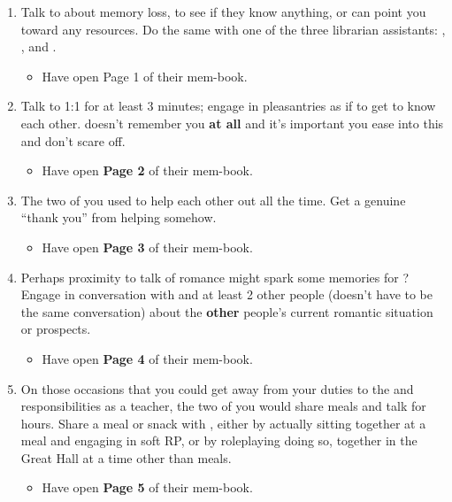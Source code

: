 \documentclass[green]{GL2020}
\begin{document}
\begin{enumerate}
  \item Talk to \cLibrarian{\full} about memory loss, to see if they know anything, or can point you toward any resources. Do the same with one of the three librarian assistants: \cAmbition{\full}, \cLibAssist{\full}, and \cPresident{\full}.
  \begin{itemize}
    \item Have \cHeadScientist{} open Page 1 of their mem-book. 
  \end{itemize}
  \item Talk to \cHeadScientist{} 1:1 for at least 3 minutes; engage in pleasantries as if to get to know each other. \cHeadScientist{} doesn’t remember you \textbf{at all} and it’s important you ease into this and don’t scare \cHeadScientist{\them} off.
  \begin{itemize}
    \item Have \cHeadScientist{} open \textbf{Page 2} of their mem-book.
  \end{itemize}
  \item The two of you used to help each other out all the time. Get a genuine “thank you” from helping \cHeadScientist{} somehow.
  \begin{itemize}
    \item Have \cHeadScientist{} open \textbf{Page 3} of their mem-book.
  \end{itemize}
  \item Perhaps proximity to talk of romance might spark some memories for \cHeadScientist{}? Engage in conversation with \cHeadScientist{} and at least 2 other people (doesn’t have to be the same conversation) about the \textbf{other} people’s current romantic situation or prospects.
  \begin{itemize}
    \item Have \cHeadScientist{} open \textbf{Page 4} of their mem-book.
  \end{itemize}
  \item On those occasions that you could get away from your duties to the \pGoaties{} and responsibilities as a teacher, the two of you would share meals and talk for hours. Share a meal or snack with \cHeadScientist{}, either by actually sitting together at a meal and engaging in soft RP, or by roleplaying doing so, together in the Great Hall at a time other than meals.
  \begin{itemize}
    \item Have \cHeadScientist{} open \textbf{Page 5} of their mem-book.

\end{itemize}
\end{enumerate}
\end{document}
